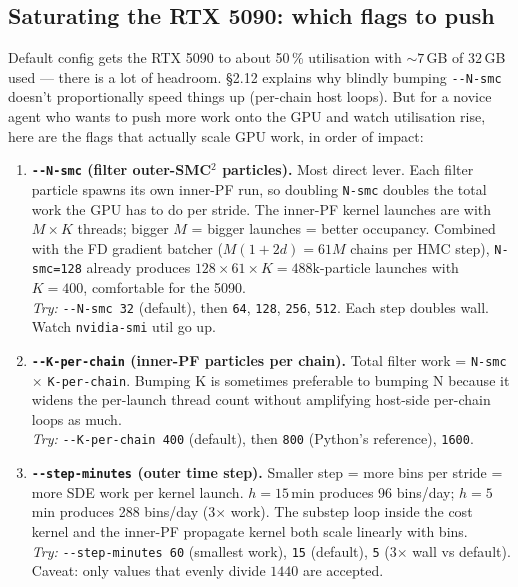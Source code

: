 \documentclass[11pt,a4paper]{article}
\begin{document}
\subsection{Saturating the RTX 5090: which flags to push}

Default config gets the RTX 5090 to about 50\,\% utilisation with
$\sim 7\,$GB of $32\,$GB used --- there is a lot of headroom. \S 2.12
explains why blindly bumping \texttt{-{}-N-smc} doesn't proportionally
speed things up (per-chain host loops). But for a novice agent who
wants to push more work onto the GPU and watch utilisation rise,
here are the flags that actually scale GPU work, in order of impact:

\begin{enumerate}[itemsep=4pt,leftmargin=*]
\item \textbf{\texttt{-{}-N-smc} (filter outer-SMC$^2$ particles).}
  Most direct lever. Each filter particle spawns its own inner-PF run,
  so doubling \texttt{N-smc} doubles the total work the GPU has to
  do per stride. The inner-PF kernel launches are with
  $M \times K$ threads; bigger $M$ = bigger launches = better
  occupancy. Combined with the FD gradient batcher
  ($M(1+2d) = 61M$ chains per HMC step), \texttt{N-smc=128} already
  produces $128 \times 61 \times K = 488\mathrm{k}$-particle launches
  with $K=400$, comfortable for the 5090.\\
  \emph{Try:} \texttt{-{}-N-smc 32} (default), then \texttt{64},
  \texttt{128}, \texttt{256}, \texttt{512}. Each step doubles wall.
  Watch \texttt{nvidia-smi} util go up.

\item \textbf{\texttt{-{}-K-per-chain} (inner-PF particles per chain).}
  Total filter work = \texttt{N-smc} $\times$ \texttt{K-per-chain}.
  Bumping K is sometimes preferable to bumping N because it widens
  the per-launch thread count without amplifying host-side per-chain
  loops as much.\\
  \emph{Try:} \texttt{-{}-K-per-chain 400} (default), then
  \texttt{800} (Python's reference), \texttt{1600}.

\item \textbf{\texttt{-{}-step-minutes} (outer time step).} Smaller
  step = more bins per stride = more SDE work per kernel launch.
  $h = 15\,$min produces 96 bins/day; $h = 5\,$min produces 288
  bins/day (3$\times$ work). The substep loop inside the cost
  kernel and the inner-PF propagate kernel both scale linearly with
  bins.\\
  \emph{Try:} \texttt{-{}-step-minutes 60} (smallest work),
  \texttt{15} (default), \texttt{5} (3$\times$ wall vs default).
  Caveat: only values that evenly divide $1440$ are accepted.


\end{enumerate}
\end{document}
